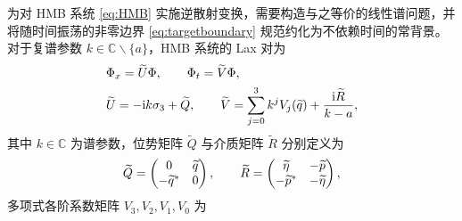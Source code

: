 为对 HMB 系统 \eqref{eq:HMB} 实施逆散射变换，需要构造与之等价的线性谱问题，并将随时间振荡的非零边界 \eqref{eq:targetboundary} 规范约化为不依赖时间的常背景。对于复谱参数 $k\in\mathbb C\mathbin{\backslash}\{a\}$，HMB 系统的 Lax 对为\cite{LHP2013}
\begin{equation}\label{eq:lax}
\begin{aligned}
&\Phi_x=\widetilde U\Phi,\qquad \Phi_t=\widetilde V\Phi,\\
&\widetilde U=-\mathrm{i} k\sigma_3+\widetilde Q,\qquad
\widetilde V=\sum\limits_{j=0}^{3}k^jV_j(\widetilde q)+\dfrac{\mathrm{i} \widetilde R}{k-a},
\end{aligned}
\end{equation}
其中 $k\in\mathbb C$ 为谱参数，位势矩阵 $\widetilde Q$ 与介质矩阵 $\widetilde R$ 分别定义为
\begin{equation}\label{eq:potential-matrices}
\widetilde Q=\begin{pmatrix}0&\widetilde q\\-{\widetilde q}^{*}&0\end{pmatrix},\qquad
\widetilde R=\begin{pmatrix}\widetilde\eta&-\widetilde p\\-{\widetilde p}^{*}&-\widetilde\eta\end{pmatrix},
\end{equation}
多项式各阶系数矩阵 $V_3,V_2,V_1,V_0$ 为
